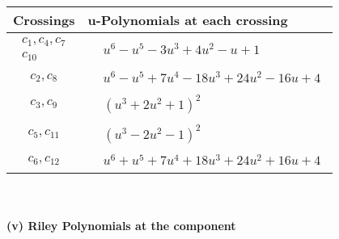 \documentclass[1p]{elsarticle_modified}
\theoremstyle{definition}
\begin{document}
\begin{tabular}{m{50pt}|m{274pt}}
Crossings & \hspace{64pt}u-Polynomials at each crossing \\
\hline $$\begin{aligned}c_{1},c_{4},c_{7}\\c_{10}\end{aligned}$$&$\begin{aligned}
&u^6- u^5-3 u^3+4 u^2- u+1
\end{aligned}$\\
\hline $$\begin{aligned}c_{2},c_{8}\end{aligned}$$&$\begin{aligned}
&u^6- u^5+7 u^4-18 u^3+24 u^2-16 u+4
\end{aligned}$\\
\hline $$\begin{aligned}c_{3},c_{9}\end{aligned}$$&$\begin{aligned}
&(u^3+2 u^2+1)^2
\end{aligned}$\\
\hline $$\begin{aligned}c_{5},c_{11}\end{aligned}$$&$\begin{aligned}
&(u^3-2 u^2-1)^2
\end{aligned}$\\
\hline $$\begin{aligned}c_{6},c_{12}\end{aligned}$$&$\begin{aligned}
&u^6+u^5+7 u^4+18 u^3+24 u^2+16 u+4
\end{aligned}$\\
\hline
\end{tabular}\\~\\
\newpage\renewcommand{\arraystretch}{1}
\flushleft \textbf{(v) Riley Polynomials at the component}\newline \\
\end{document}
